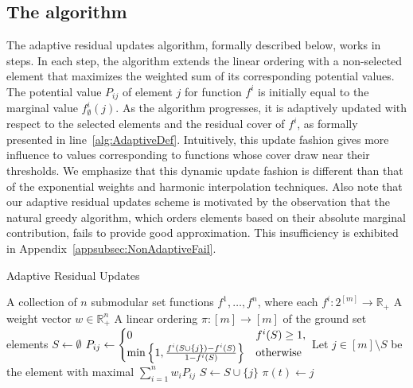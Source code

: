 \documentclass[11pt]{article}
\theoremstyle{plain}
\theoremstyle{definition}
\newcommand{\bbR}{\mathbb{R}}
\begin{document}
\subsection{The algorithm} \label{subsec:Algorithm}

The adaptive residual updates algorithm, formally described below,
works in steps. In each step, the algorithm extends the linear
ordering with a non-selected element that maximizes the weighted
sum of its corresponding potential values. The potential value
$P_{ij}$ of element $j$ for function $f^i$ is initially equal to
the marginal value $f^i_\emptyset(j)$. As the algorithm
progresses, it is adaptively updated with respect to the selected
elements and the residual cover of $f^i$, as formally presented in
line~\ref{alg:AdaptiveDef}. Intuitively, this update fashion gives
more influence to values corresponding to functions whose cover
draw near their thresholds. We emphasize that this dynamic update
fashion is different than that of the exponential weights and
harmonic interpolation techniques. Also note that our adaptive
residual updates scheme is motivated by the observation that the
natural greedy algorithm, which orders elements based on their
absolute marginal contribution, fails to provide good
approximation. This insufficiency is exhibited in
Appendix~\ref{appsubsec:NonAdaptiveFail}.

\begin{algorithm}
\caption{Adaptive Residual Updates}\label{cap:AdaptiveUpdate}\begin{algorithmic}[1]
\Require A collection of $n$ submodular set functions $f^1, \ldots, f^n$, where each $f^i: 2^{[m]} \to \bbR_+$ \Statex \qquad\quad A weight vector $w \in \bbR_+^n$ \Ensure A linear ordering $\pi: [m] \to [m]$ of the ground set elements \smallskip 
\State $S \leftarrow \emptyset$    \State $P_{ij} \leftarrow \begin{cases} 0 & f^i(S) \geq 1, \\ \min\left\{1, \frac{f^i(S \cup \{j\}) - f^i(S)}{1 - f^i(S)}\right\} & \makebox{otherwise} \end{cases}$ \label{alg:AdaptiveDef} \EndFor \EndFor \State Let $j \in [m] \setminus S$ be the element with maximal $\sum_{i = 1}^{n}w_i P_{ij}$ \State $S \leftarrow S \cup \{ j \}$ \State $\pi(t) \leftarrow j$ \EndFor \end{algorithmic}
\end{algorithm}
\end{document}
